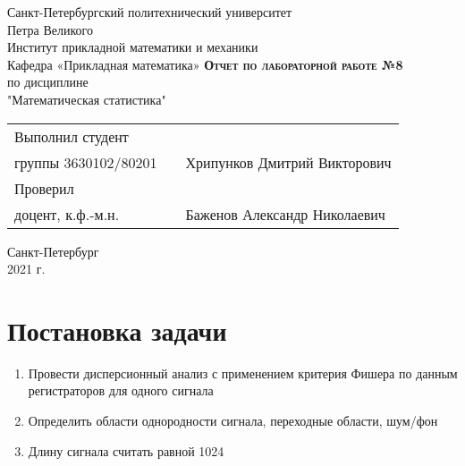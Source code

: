 \documentclass[12pt,a4paper]{article}
\begin{document}
    \begin{titlepage}
        \begin{center}
            \large
            Санкт-Петербургский политехнический университет\\Петра Великого\\
            \vspace{0.5cm}
            Институт прикладной математики и механики\\
            \vspace{0.25cm}
            Кафедра «Прикладная математика»
            \vfill
            \textsc{\LARGE\textbf{Отчет по лабораторной работе №8}}\\[5mm]
            \Large
            по дисциплине\\"Математическая статистика"
        \end{center}
        \vfill
        \begin{tabular}{l p{175pt} l}
            Выполнил студент \\ группы 3630102/80201 && Хрипунков Дмитрий Викторович
            \vspace{0.25cm}
            \\Проверил \\ доцент, к.ф.-м.н. && Баженов Александр Николаевич
        \end{tabular}
        \vfill
        \begin{center}
            Санкт-Петербург \\ 2021 г.
        \end{center}
    \end{titlepage}
    
\newpage
\begin{center}
    \tableofcontents
    \setcounter{page}{2}
\end{center}
\newpage
\begin{center}
    \listoffigures
\end{center}

\newpage
\section{Постановка задачи}
\begin{enumerate}
    \item Провести дисперсионный анализ с применением критерия Фишера по данным регистраторов для одного сигнала
    \item Определить области однородности сигнала, переходные области, шум/фон
    \item Длину сигнала считать равной 1024
\end{enumerate}
\end{document}
